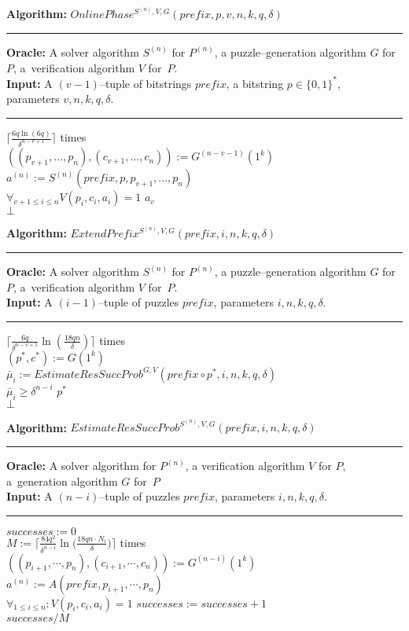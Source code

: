 %
\begin{codeblock}
  \textbf{Algorithm:} $\mathit{OnlinePhase^{S^{(n)}, V, G}(\mathit{prefix}, p, v, n, k, q, \delta)}$
  \medskip \hrule
  \textbf{Oracle:} A solver algorithm $S^{(n)}$ for $P^{(n)}$, a puzzle--generation algorithm $G$ for $P$, a~verification algorithm $V$ for~$P$.\\
  \textbf{Input:} A $(v-1)$--tuple of bitstrings $\mathit{prefix}$, a bitstring $p \in \{0,1\}^{*}$, \\ parameters $v, n, k, q, \delta$.
  \medskip\hrule
  \Repeat $\Big\lceil\frac{6q \ln (6q)}{\delta^{n-v+1}}\Big\rceil$ times \\
  \IndI $((p_{v+1}, \dotsc, p_{n}),(c_{v+1}, \dots, c_n)) := G^{(n-v-1)}(1^k)$\\
  \IndI $a^{(n)} := S^{(n)}(\mathit{prefix}, p, p_{v+1}, \dotsc, p_n)$\\
  \IndI \If $\forall_{v+1 \leq i \leq n} V(p_i, c_i, a_i) = 1$ \Then \Return $a_v$\\
  \Return $\bot$
\end{codeblock}
%
\begin{codeblock}
  \textbf{Algorithm:} $\mathit{ExtendPrefix^{S^{(n)}, V, G}(prefix, i, n, k, q, \delta)}$
  \medskip \hrule
  \textbf{Oracle:} A solver algorithm $S^{(n)}$ for $P^{(n)}$, a puzzle--generation algorithm $G$ for $P$, a~verification algorithm $V$ for~$P$.\\
  \textbf{Input:} A $(i-1)$--tuple of puzzles $\mathit{prefix}$, parameters $i, n, k, q, \delta$.
  \medskip\hrule
  \Repeat $\Big\lceil \frac{6q}{\delta^{n-v+1}} \ln (\frac{18qn}{\delta}) \Big\rceil$ times \Do \\
  \IndI $(p^*, c^*) := G(1^k) $\\
  \IndI $\bar{\mu}_i := \mathit{EstimateResSuccProb}^{G,V}(\mathit{prefix} \circ p^*, i, n, k, q, \delta)$\\
  \IndI \If $\bar{\mu}_i \geq \delta^{n-i}$ \Then \Return $p^*$ \\
  \Return $\bot$
\end{codeblock}
%
\begin{codeblock}
  \textbf{Algorithm:} $\mathit{EstimateResSuccProb}^{S^{(n)},V, G}(\mathit{prefix}, i, n, k, q, \delta)$
  \medskip \hrule
  \textbf{Oracle:} A solver algorithm for $P^{(n)}$, a verification algorithm $V$ for $P$, a~generation algorithm $G$ for~$P$\\
  \textbf{Input:} A $(n-i)$--tuple of puzzles $\mathit{prefix}$, parameters $i, n, k, q, \delta$.
  \medskip\hrule
  $successes := 0$ \\
  \Repeat $M := \Big\lceil \frac{84q^2}{\delta^{n-i}} \ln \Big(\frac{18qn \cdot N_i}{\delta} \Big) \Big\rceil$ times \\
  \IndI $((p_{i+1}, \cdots, p_n), (c_{i+1}, \cdots, c_n)) := G^{(n-i)}(1^k)$\\
  \IndI $a^{(n)} := A(\mathit{prefix}, p_{i+1}, \cdots, p_{n})$\\
  \IndI \If $\forall_{1 \leq i \leq n} : V(p_i, c_i, a_i) = 1$ \Then $\mathit{successes := successes + 1}$ \\
  \Return $successes / M$
\end{codeblock}
